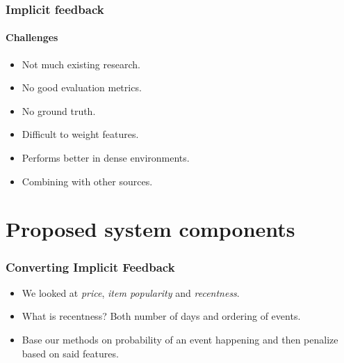\documentclass{beamer}
\begin{document}
  \begin{frame}
    \frametitle{Implicit feedback}
    \framesubtitle{Challenges}
    \begin{itemize}
      \item Not much existing research.
      \item No good evaluation metrics.
      \item No ground truth.
      \item Difficult to weight features.
      \item Performs better in dense environments.
      \item Combining with other sources.
    \end{itemize}
  \end{frame}


  \section{Proposed system components}

  \begin{frame}
    \frametitle{Converting Implicit Feedback}
    \begin{itemize}
      \item We looked at \textit{price}, \textit{item popularity} and
      \textit{recentness}.
      \item What is recentness? Both number of days and ordering of events.
      \item Base our methods on probability of an event happening and then
      penalize based on said features.
    \end{itemize}
  \end{frame}
\end{document}
